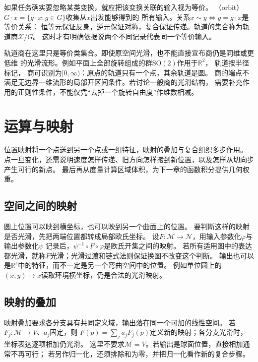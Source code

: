 如果任务确实要忽略某类变换，就应把该变换关联的输入视为等价。
（orbit）$G\cdot x=\{g\cdot x:g\in G\}$收集从$x$出发能够得到的
所有输入。关系$x\sim y\Longleftrightarrow y=g\cdot x$是等价关系：
恒等元保证反身，逆元保证对称，复合保证传递。轨道的集合称为轨道商$\mathcal X/G$。
这时才有明确依据说两个不同记录代表同一个等价输入。


轨道商在这里只是等价类集合。即使原空间光滑，也不能直接宣布商仍是同维或更低维
的光滑流形。例如平面上全部旋转组成的群$\mathrm{SO}(2)$作用于$\mathbb R^2$，
轨道按半径标记，
商可识别为$[0,\infty)$：原点的轨道只有一个点，其余轨道是圆。
商的端点不满足无边界一维流形的局部开区间条件。若讨论一般商的光滑结构，
需要补充作用的正则性条件，不能仅凭“去掉一个旋转自由度”作维数相减。

\section{运算与映射}
\label{sec:geometry-operations}

位置映射将一个点送到另一个点或一组特征，映射的叠加与复合组织多步作用。
点一旦变化，还需说明速度怎样传递、旧方向怎样搬到新位置，以及怎样从切向步产生可行的新点。
最后再从度量计算区域体积，为下一章的函数积分提供几何权重。

\subsection{空间之间的映射}
\label{sec:geometry-point-maps}

圆上位置可以映到横坐标，也可以映到另一个曲面上的位置。
要判断这样的映射是否光滑，先把两端位置都转成局部欧氏坐标。
设$F:\mathcal M\to\mathcal N$，用输入参数化$\varphi$与输出参数化$\psi$
记录后，$\psi^{-1}\circ F\circ\varphi$是欧氏开集之间的映射。
若所有适用图中的表达都光滑，就称$F$光滑；光滑过渡和链式法则保证换图不改变这个判断。
输出也可以是$\mathbb R^r$中的特征，而不一定是另一个弯曲空间中的位置。
例如单位圆上的$(x,y)\mapsto x$读取环境横坐标，仍是合法的光滑映射。

\subsection{映射的叠加}
\label{sec:geometry-map-addition}

映射叠加要求各分支具有共同定义域，输出落在同一个可加的线性空间。
若$F_j:\mathcal M\to V$、$a_j$固定，则
$F(p)=\sum_j a_jF_j(p)$定义新的映射；各分支光滑时，坐标表达逐项相加仍光滑。
这里不要求$\mathcal M=V$。若输出是球面位置，直接相加通常不再可行；
若另作归一化，还须排除和为零，并把归一化看作新的复合步骤。

